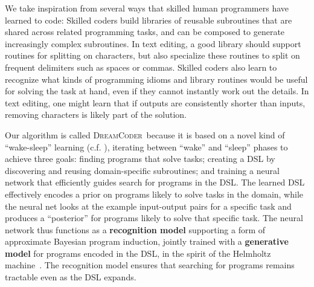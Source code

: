 \documentclass{article}
\newcommand{\system}{\textsc{DreamCoder}~}
\begin{document}

We take inspiration from several ways that skilled human
programmers have learned to code: Skilled coders build libraries of
reusable subroutines that are shared across related programming tasks,
and can be composed to generate increasingly complex
subroutines.  In text editing, a good library should support routines
for splitting on characters, but also specialize these routines to
split on frequent delimiters such as spaces or commas. Skilled coders
also learn to recognize what kinds of programming idioms and library
routines would be useful for solving the task at hand, even if they
cannot instantly work out the details.  In text editing, one might
learn that if outputs are consistently shorter than inputs, removing
characters is likely part of the solution.%

Our algorithm is called \system because it is based on a
novel kind of ``wake-sleep'' learning (c.f. \cite{hinton1995wake}), iterating
between ``wake'' and ``sleep'' phases to achieve three goals: finding
programs that solve tasks; creating a DSL by discovering
and reusing domain-specific subroutines; and training a neural network
that efficiently guides search for programs in the DSL.
The learned DSL effectively encodes a prior on programs likely to
solve tasks in the domain, while the neural net looks at the example
input-output pairs for a specific task and produces a ``posterior''
for programs likely to solve that specific task.  The neural network
thus functions as a \textbf{recognition model} supporting a form of
approximate Bayesian program induction, jointly trained with a
\textbf{generative model} for programs encoded in the DSL, in the
spirit of the Helmholtz machine~\cite{hinton1995wake}. The
recognition model ensures that searching for programs remains
tractable even as the DSL %
expands.
\end{document}
